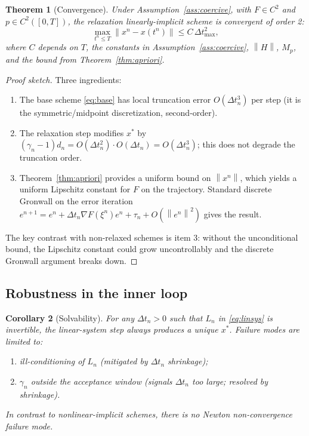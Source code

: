\documentclass[11pt]{article}
\newtheorem{theorem}{Theorem}
\newtheorem{corollary}[theorem]{Corollary}
\theoremstyle{definition}
\newcommand{\norm}[1]{\left\|#1\right\|}
\newcommand{\dt}{\Delta t}
\begin{document}
\begin{theorem}[Convergence]
\label{thm:convergence}
Under Assumption~\ref{ass:coercive}, with $F \in C^2$ and $p \in C^2([0,T])$, the relaxation linearly-implicit scheme is convergent of order 2:
\[
\max_{t^n \le T} \norm{x^n - x(t^n)} \le C \, \dt_{\max}^2,
\]
where $C$ depends on $T$, the constants in Assumption~\ref{ass:coercive}, $\norm{H}$, $M_p$, and the bound from Theorem~\ref{thm:apriori}.
\end{theorem}

\begin{proof}[Proof sketch]
Three ingredients:
\begin{enumerate}
    \item The base scheme \eqref{eq:base} has local truncation error $O(\dt_n^3)$ per step (it is the symmetric/midpoint discretization, second-order).
    \item The relaxation step modifies $x^*$ by $(\gamma_n - 1) d_n = O(\dt_n^2) \cdot O(\dt_n) = O(\dt_n^3)$; this does not degrade the truncation order.
    \item Theorem~\ref{thm:apriori} provides a uniform bound on $\norm{x^n}$, which yields a uniform Lipschitz constant for $F$ on the trajectory. Standard discrete Gronwall on the error iteration $e^{n+1} = e^n + \dt_n \nabla F(\xi^n) e^n + \tau_n + O(\norm{e^n}^2)$ gives the result.
\end{enumerate}
The key contrast with non-relaxed schemes is item 3: without the unconditional bound, the Lipschitz constant could grow uncontrollably and the discrete Gronwall argument breaks down.
\end{proof}

\subsection{Robustness in the inner loop}

\begin{corollary}[Solvability]
\label{cor:solvable}
For any $\dt_n > 0$ such that $L_n$ in \eqref{eq:linsys} is invertible, the linear-system step always produces a unique $x^*$. Failure modes are limited to:
\begin{enumerate}[label=(\roman*)]
    \item ill-conditioning of $L_n$ (mitigated by $\dt_n$ shrinkage);
    \item $\gamma_n$ outside the acceptance window (signals $\dt_n$ too large; resolved by shrinkage).
\end{enumerate}
In contrast to nonlinear-implicit schemes, there is no Newton non-convergence failure mode.
\end{corollary}
\end{document}
